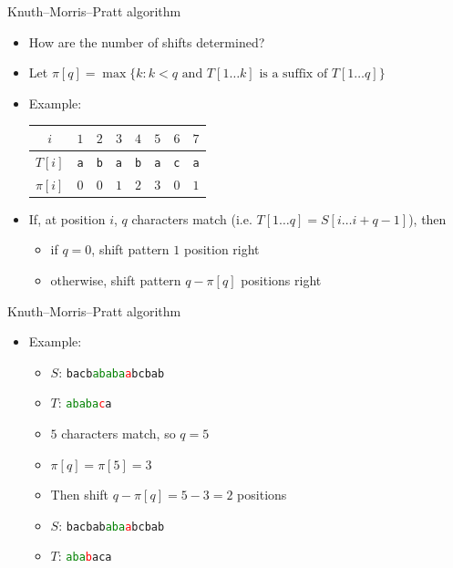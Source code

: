 \documentclass{beamer}
\begin{document}
	\begin{frame}[plain]{Knuth--Morris--Pratt algorithm}
		\begin{itemize}
			\item How are the number of shifts determined?
			\vspace{5pt}
			\item Let {\footnotesize $\pi[q] = \max \{ k : k < q \textrm{ and } T[1\ldots k] \textrm{ is a suffix of } T[1\ldots q] \}$}
			\vspace{5pt}
			\item<2-> Example:\\
			\begin{center}
				\begin{tabular}{cccccccc}
					$i$ & $1$ & $2$ & $3$ & $4$ & $5$ & $6$ & $7$ \\
					\hline
					$T[i]$&\texttt{a}&\texttt{b}&\texttt{a}&\texttt{b}&\texttt{a}&\texttt{c}&\texttt{a} \\
					$\pi[i]$ & $0$ & $0$ & $1$ & $2$ & $3$ & $0$ & $1$\\
				\end{tabular}
			\end{center}
			\vspace{5pt}
			\item<3-> If, at position $i$, $q$ characters match (i.e. $T[1\ldots q] = S[i\ldots i+q-1]$), then
			\begin{itemize}
				\item if $q = 0$, shift pattern $1$ position right
				\item otherwise, shift pattern $q - \pi[q]$ positions right
			\end{itemize}
		\end{itemize}
	\end{frame}
	
	\begin{frame}[plain]{Knuth--Morris--Pratt algorithm}
		\begin{itemize}
			\item Example:
			\begin{itemize}
				\item $S$: \texttt{bacb\textcolor{green}{ababa}\textcolor{red}{a}bcbab}
				\item $T$: \texttt{\textcolor{green}{ababa}\textcolor{red}{c}a}
				\item<2-> $5$ characters match, so $q = 5$
				\item<3-> $\pi[q] = \pi[5] = 3$
				\item<4-> Then shift $q - \pi[q] = 5 - 3 = 2$ positions
				\item<5-> $S$: \texttt{bacbab\textcolor{green}{aba}\textcolor{red}{a}bcbab}
				\item<5-> $T$: \texttt{\textcolor{green}{aba}\textcolor{red}{b}aca}
			\end{itemize}
		\end{itemize}
	\end{frame}
	
\end{document}
